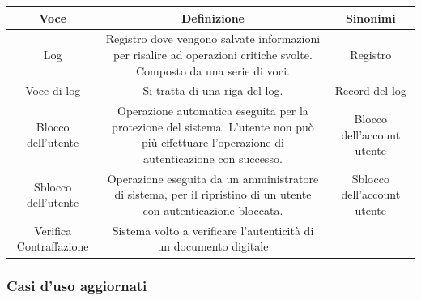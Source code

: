 \documentclass[a4paper]{article}
\begin{document}
  \begin{center}
    \begin{tabulary}{1\textwidth}{|c|C|C|}
        \hline
        \textbf{Voce} & \textbf{Definizione} & \textbf{Sinonimi}\\
        \hline
        \hline
		Log & Registro dove vengono salvate informazioni per risalire ad operazioni critiche svolte. Composto da una serie di voci. & Registro \\
		\hline
		Voce di log & Si tratta di una riga del log. & Record del log\\
		\hline
		Blocco dell'utente & Operazione automatica eseguita per la protezione del sistema. L'utente non può più effettuare l'operazione di autenticazione con successo. & Blocco dell'account utente \\
		\hline
		Sblocco dell'utente & Operazione eseguita da un amministratore di sistema, per il ripristino di un utente con autenticazione bloccata. & Sblocco dell'account utente\\
		\hline
		Verifica Contraffazione & Sistema volto a verificare l'autenticità di un documento digitale & \\
		\hline
    \end{tabulary}
  \end{center}

\newpage

\subsubsection{Casi d'uso aggiornati}

\end{document}
